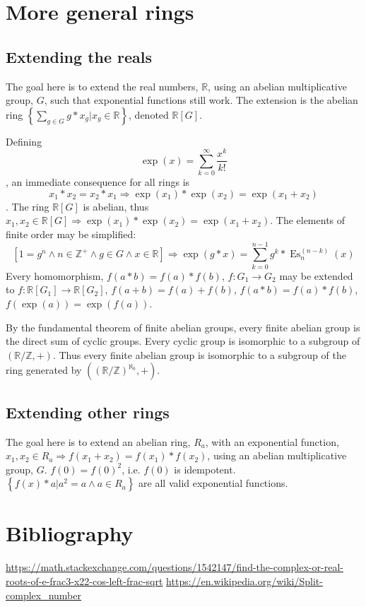 \documentclass[]{article}
\DeclareMathOperator{\es}{Es}
\newcommand{\pqty}[1]{{\left(#1\right)}}
\newcommand{\Bqty}[1]{{\left\{#1\right\}}}
\newcommand{\bqty}[1]{{\left[#1\right]}}
\begin{document}
	\section{More general rings}
	\subsection{Extending the reals}
	The goal here is to extend the real numbers, $\mathbb{R}$, using an abelian multiplicative group, $G$, such that exponential functions still work. The extension is the abelian ring $\Bqty{\sum_{g\in G}g*x_g \bigg\vert x_g\in\mathbb{R}}$, denoted $\mathbb{R}\bqty{G}$.
	
	Defining
	\begin{equation}
	\exp(x)=\sum_{k=0}^{\infty}\frac{x^k}{k!}
	\end{equation}
	, an immediate consequence for all rings is
	\begin{equation}
	x_1*x_2=x_2*x_1\Rightarrow\exp(x_1)*\exp(x_2)=\exp(x_1+x_2)
	\end{equation}
	. The ring $\mathbb{R}\bqty{G}$ is abelian, thus $x_1,x_2\in\mathbb{R}\bqty{G}\Rightarrow\exp(x_1)*\exp(x_2)=\exp(x_1+x_2)$. The elements of finite order may be simplified:
	\begin{equation}
	\bqty{1=g^n\land n\in\mathbb{Z}^+\land g\in G\land x\in\mathbb{R}}\Rightarrow\exp\pqty{g*x}=\sum_{k=0}^{n-1}g^k*\es_n^{(n-k)}\pqty{x}
	\end{equation}
	Every homomorphism, $f\pqty{a*b}=f\pqty{a}*f\pqty{b}$, $f:G_1\rightarrow G_2$ may be extended to $f:\mathbb{R}\bqty{G_1}\rightarrow \mathbb{R}\bqty{G_2}$, $f\pqty{a+b}=f\pqty{a}+f\pqty{b}$, $f\pqty{a*b}=f\pqty{a}*f\pqty{b}$, $f\pqty{\exp\pqty{a}}=\exp\pqty{f\pqty{a}}$.
	
	By the fundamental theorem of finite abelian groups, every finite abelian group is the direct sum of cyclic groups. Every cyclic group is isomorphic to a subgroup of $\pqty{\mathbb{R}/\mathbb{Z},+}$. Thus every finite abelian group is isomorphic to a subgroup of the ring generated by $\pqty{\pqty{\mathbb{R}/\mathbb{Z}}^{\aleph_0},+}$.
	
	\subsection{Extending other rings}
	The goal here is to extend an abelian ring, $R_a$, with an exponential function, $x_1,x_2\in R_a\Rightarrow f(x_1+x_2)=f(x_1)*f(x_2)$, using an abelian multiplicative group, $G$.
	$
	f\pqty{0}=f\pqty{0}^2
	$, i.e. $f\pqty{0}$ is idempotent. $\Bqty{f(x)*a \vert a^2=a\land a\in R_a}$ are all valid exponential functions.
	
	
	
	\section{Bibliography}
	\url{https://math.stackexchange.com/questions/1542147/find-the-complex-or-real-roots-of-e-frac3-x22-cos-left-frac-sqrt}
	\url{https://en.wikipedia.org/wiki/Split-complex_number}
	
\end{document}
